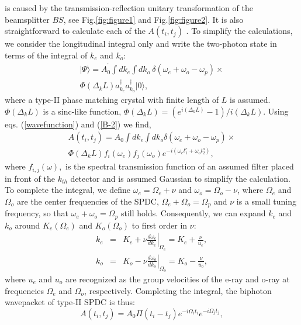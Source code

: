 is caused by the transmission-reflection unitary transformation of the beamsplitter $BS$,
see Fig.\ref{fig:figure1} and Fig.\ref{fig:figure2}. It is also straightforward to
calculate each of the $A(t_{i}, t_{j})$ \cite{function}. To simplify the calculations, we
consider the longitudinal integral only and write the two-photon state in terms of the
integral of $k_{e}$ and $k_{o}$:
\begin{eqnarray}
| \Psi \rangle =A_{0}^{^{\prime}}\int dk_{e}\int dk_{o}\
\delta(\omega_{e}+\omega_{o}-\omega_{p}) \times \nonumber \\ \Phi(\Delta_{k}L)
a_{k_{e}}^{\dagger}a_{k_{o}}^{\dagger}|0\rangle ,  \label{B-2}
\end{eqnarray}
where a type-II phase matching crystal with finite length of $L$ is assumed.
$\Phi(\Delta_{k}L)$ is a sinc-like function,
$\Phi(\Delta_{k}L)=(e^{i(\Delta_{k}L)}-1)/i(\Delta_{k}L)$. Using eqs.
(\ref{wavefunction}) and (\ref{B-2}) we find,
\begin{eqnarray}
A(t_{i}, t_{j})=A_{0}\int dk_{e}\int dk_{o} \delta(\omega_{e}+\omega_{o}-\omega_{p})
\times \nonumber \\
\Phi(\Delta_{k}L) f_{i}(\omega_{e})f_{j}(\omega_{o})
e^{-i(\omega_{e}t_{1}^{e}+\omega_{o}t_{2}^{o})} , \label{B-5}
\end{eqnarray}
where $f_{i,j}(\omega ),$ is the spectral transmission function of an assumed filter
placed in front of the $k_{th}$ detector and is assumed Gaussian to simplify the
calculation. To complete the integral, we define $\omega_{e}=\Omega_{e}+\nu$ and
$\omega_{o}=\Omega_{o}-\nu$, where $\Omega_{e}$ and $\Omega_{o}$ are the center
frequencies of the SPDC, $\Omega_{e}+\Omega_{o}=\Omega_{p}$ and $\nu$ is a small tuning
frequency, so that $\omega_{e}+\omega_{o}=\Omega_{p}$ still holds. Consequently, we can
expand $k_{e}$ and $k_{o}$ around $K_{e}(\Omega_{e})$ and $K_{o}(\Omega_{o})$ to first
order in $\nu$:
\begin{eqnarray}
k_{e} &=& K_{e}+\nu \left.\frac{d\omega_{e}}{dk_{e}}\right|_{\Omega_{e}} = K_{e}+%
\frac{\nu}{u_{e}} , \nonumber \\ k_{o} &=& K_{o}-\nu
\left.\frac{d\omega_{o}}{dk_{o}}\right|_{\Omega_{o}} = K_{o}-\frac{\nu}{u_{o}} ,
\label{B-6}
\end{eqnarray}
where $u_{e}$ and $u_{o}$ are recognized as the group velocities of the e-ray and o-ray
at frequencies $\Omega_{e}$ and $\Omega_{o}$, respectively. Completing the integral, the
biphoton wavepacket of type-II SPDC is thus:
\begin{equation}
A(t_{i}, t_{j})=A_{0} \Pi(t_{i}-t_{j}) e^{-i\Omega_{i}t_{i}} e^{-i\Omega_{j}t_{j}} ,
\label{B-14}
\end{equation}
